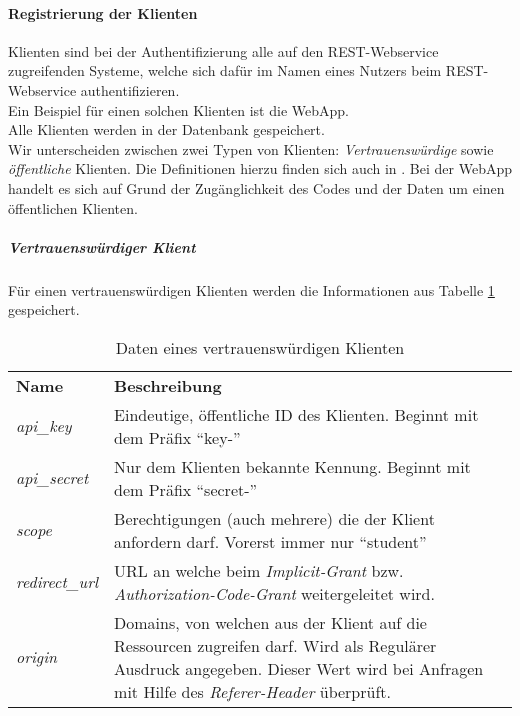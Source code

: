 \paragraph{Registrierung der Klienten}
Klienten sind bei der Authentifizierung alle auf den REST-Webservice zugreifenden Systeme, welche sich dafür im Namen eines Nutzers beim REST-Webservice authentifizieren.\\
Ein Beispiel für einen solchen Klienten ist die WebApp.\\
Alle Klienten werden in der Datenbank gespeichert.\\
Wir unterscheiden zwischen zwei Typen von Klienten: \textit{Vertrauenswürdige} sowie \textit{öffentliche} Klienten. Die Definitionen hierzu finden sich auch in \cite[Kap. 2.1]{rfc6749}. Bei der WebApp handelt es sich auf Grund der Zugänglichkeit des Codes und der Daten um einen öffentlichen Klienten.
\subparagraph{Vertrauenswürdiger Klient}
Für einen vertrauenswürdigen Klienten werden die Informationen aus Tabelle \ref{tab:api-auth-confidential-client-data} gespeichert.\\
\begin{table}
	\begin{tabular}{@{} | p{} | p{} | @{}} 
		\hline
		\textbf{Name} & \textbf{Beschreibung}\\ \hhline{|=|=|}
		\textit{api\_key} & Eindeutige, öffentliche ID des Klienten. Beginnt mit dem Präfix \enquote{key-} \\ \hline
		\textit{api\_secret} & Nur dem Klienten bekannte Kennung. Beginnt mit dem Präfix \enquote{secret-} \\ \hline
		\textit{scope} & Berechtigungen (auch mehrere) die der Klient anfordern darf. Vorerst immer nur \enquote{student} \\ \hline
		\textit{redirect\_url} & URL an welche beim \textit{Implicit-Grant} bzw. \textit{Authorization-Code-Grant} weitergeleitet wird. \\ \hline
		\textit{origin} & Domains, von welchen aus der Klient auf die Ressourcen zugreifen darf. Wird als Regulärer Ausdruck angegeben. Dieser Wert wird bei Anfragen mit Hilfe des \textit{Referer-Header} überprüft. \\
		\hline
	\end{tabular}
	\caption{Daten eines vertrauenswürdigen Klienten}
	\label{tab:api-auth-confidential-client-data}
\end{table}

